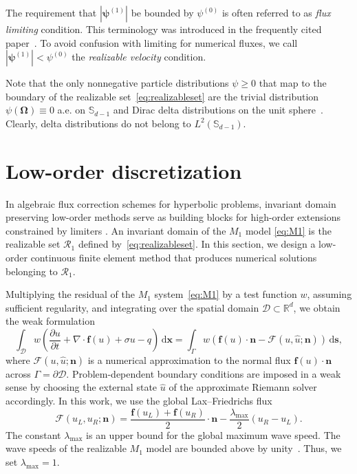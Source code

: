 \documentclass[preprint, 11pt]{elsarticle}
\newcommand{\diff}{\mathrm{d} }
\newcommand{\R}{\mathbb{R}}
\newcommand{\x}{\mathbf{x}}
\newcommand{\s}{\mathbf{s}}
\newcommand{\n}{\mathbf{n}}
\newcommand{\f}{\mathbf{f}}
\newcommand{\D}{\mathcal{D}}
\newcommand{\dv}{\nabla\cdot}
\newcommand{\Sp}{\mathbb{S}_{d-1}}
\newcommand{\OO}{\bm{\Omega}}
\newcommand{\pz}{\psi^{(0)}}
\newcommand{\po}{\boldsymbol{\psi}^{(1)}}
\begin{document}
\begin{remark}
  The requirement that $|\po|$ be bounded by $\pz$ is often referred to as
  \textit{flux limiting} condition. This terminology was introduced in the
  frequently cited paper~\cite{kershaw1976}. To avoid confusion with 
  limiting for numerical fluxes, we call $|\po|<\pz$ the
  \textit{realizable velocity} condition.
\end{remark}

\begin{remark}
    Note that the only nonnegative particle distributions $\psi\geq0$ that map to the boundary of the realizable set~\eqref{eq:realizableset} are the trivial distribution $\psi(\OO)\equiv 0$ a.e. on $\Sp$ and Dirac delta distributions on the unit sphere~\cite{kershaw1976}. 
    Clearly, delta distributions do not belong to $L^2(\Sp)$.
\end{remark}

\section{Low-order discretization}
\label{sec:LO}
In algebraic flux correction schemes for hyperbolic problems, invariant
domain preserving low-order methods serve as building blocks for high-order
extensions constrained by limiters \cite{kuzmin2023}. An invariant domain of the $M_1$ model
\eqref{eq:M1} is the realizable set $\mathcal{R}_1$ defined
by~\eqref{eq:realizableset}. In this
section, we design a low-order continuous finite element method
that produces numerical solutions belonging to $\mathcal{R}_1$.

Multiplying the residual of the $M_1$ system~\eqref{eq:M1} by a test function $w$, assuming sufficient regularity, and integrating over the spatial domain $\D\subset\R^d$, we obtain the weak formulation
\begin{equation}\label{eq:weakform}
    \int_\D w\left(\frac{\partial u}{\partial t}+\dv \f(u) + \sigma u - q\right)\,\diff\x = \int_\Gamma w\left(\f(u)\cdot \n - \mathcal{F}(u, \hat u; \n) \right)\,\diff\s,
\end{equation}
where $\mathcal{F}(u,\hat u;\n)$ is a numerical approximation to the normal flux $\f(u)\cdot\n$ across $\Gamma = \partial\D$.
Problem-dependent boundary conditions are imposed in a weak sense 
by choosing the external state $\hat u$ of the  approximate Riemann solver
accordingly.
In this work,  we use the global Lax--Friedrichs flux
\begin{equation*}
    \mathcal{F}(u_L, u_R; \n) = \frac{\f(u_L) + \f(u_R)}{2} \cdot \n -\frac{\lambda_{\max}}{2} (u_R - u_L).
\end{equation*}
The constant $\lambda_{\max}$ is an upper bound for the global maximum wave speed. The wave speeds of the realizable $M_1$ model are bounded above by unity~\cite{berthon2007, chidyagwai2018, olbrant2012}.
Thus, we set $\lambda_{\max} = 1$.
\end{document}
